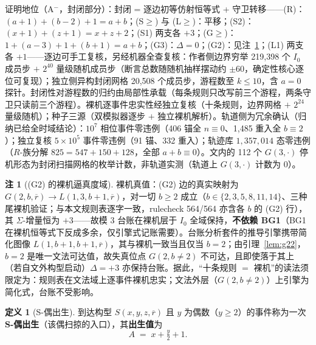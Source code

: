\documentclass[11pt]{ctexart}
\theoremstyle{definition}
\newtheorem{definition}[theorem]{定义}
\newtheorem{remark}[theorem]{注}
\begin{document}
证明地位（A$^-$，封闭部分）：封闭 = 逐边初等仿射恒等式 + 守卫转移——(R)：$(a{+}1)+(b{-}2)+1=a+b$；(S$\ge$) 与 (L$\ge$)：平移；(S2)：$(x{+}1)+(z{+}1)=x{+}z{+}2$；(S1) 两支各 $+3$；(G$\ge$)：$1+(a{-}3)+1+(b{+}1)=a+b$；(G3)：$\Delta=0$；(G2)：见注~\ref{rem:g2}；(L1) 两支各 $+1$——逐边可手工复核，另经机器全查复核：作者侧边界穷举 219,398 个 $I_0$ 成员步 $+$ $2^{40}$ 量级随机成员步（断言总数随随机抽样摆动约 $\pm60$，确定性核心逐位可复现）；独立侧异构封闭网格 20,508 个成员步，游程数至 $k\le10$，含 $a=0$ 探针。封闭性对游程数的归约由局部性承载（每条规则只改写前三个游程，两条守卫只读前三个游程）。裸机逐事件忠实性经独立复核（十条规则，边界网格 $+$ $2^{24}$ 量级随机）；种子三源（双模拟器逐步 $+$ 独立裸机解析）。轨道侧为冗余确认（归纳已给全时域结论）：$10^7$ 相位事件零违例（406 锚全 $n\equiv0$、1,485 重入全 $b\equiv2$）；独立复核 $5\times10^5$ 事件零违例（91 锚、332 重入）；轨迹库 $1{,}357{,}014$ 态零违例（$R$-族分解 $825=547{+}150{+}128$，全部 $a{+}b\equiv0$）。文内的 112 个 $G(3,\cdot)$ 停机形态为封闭扫描网格的枚举计数，非轨道实测（轨道上 $G(3,\cdot)$ 计数为 $0$）。

\begin{remark}[(G2) 的裸机逼真度域]\label{rem:g2}
裸机真值：(G2) 边的真实映射为 $G(2,b,\overline r)\to L(1,3,b{+}1,\overline r)$，对一切 $b\ge2$ 成立（$b\in\{2,3,5,8,11,14\}$、三种尾裸机验证；与本文规则表逐字一致，rulecheck 564/564 亦含各 $b$ 的 (G2) 行），其 $\Sigma$-增量恒为 $+3$——故模 3 台账在裸机层于 $I_0$ 全域保持，\textbf{不依赖 BG1}（BG1 在裸机恒等式下反成多余，仅引擎式记账需要）。台账分析套件的推导引擎携带简化图像 $L(1,b{+}1,b{+}1,\overline r)$，其与裸机一致当且仅当 $b=2$；由引理~\ref{lem:g22}，$b=2$ 是唯一文法可达值，故失真位点 $G(2,b\neq2)$ 不可达，且即使落于其上（若自文外构型启动）$\Delta=+3$ 亦保持台账。据此，``十条规则 $=$ 裸机''的读法须限定为：规则表在文法域上逐事件裸机忠实；文法外层（$G(2,b\neq2)$）上引擎为简化式，台账不受影响。
\end{remark}

\begin{definition}[S-偶出生]\label{def:birth}
到达构型 $S(x,y,z,\overline r)$ 且 $y$ 为偶数（$y\ge2$）的事件称为一次 \textbf{S-偶出生}（该偶扫掠的入口），其\textbf{出生值}为
\[
A \;=\; x+\tfrac{y}{2}+1 .
\]
\end{definition}
\end{document}
